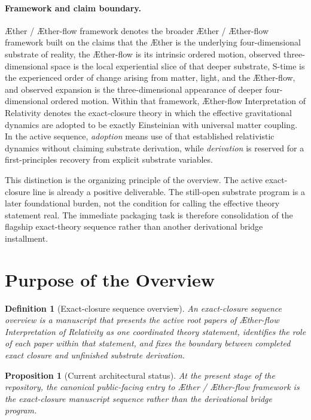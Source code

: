 \documentclass[11pt]{article}
\newcommand{\Aether}{\AE{}ther}
\newcommand{\Aflow}{\AE{}ther-flow}
\newcommand{\TheoryName}{\Aflow{} Interpretation of Relativity}
\newcommand{\TheoryProgram}{\Aether{} / \Aflow{} framework}
\newtheorem{definition}{Definition}
\newtheorem{proposition}{Proposition}
\begin{document}
\paragraph{Framework and claim boundary.}
\TheoryProgram{} denotes the broader \Aether{} / \Aflow{} framework built on the claims that the \Aether{} is the underlying four-dimensional substrate of reality, the \Aflow{} is its intrinsic ordered motion, observed three-dimensional space is the local experiential slice of that deeper substrate, S-time is the experienced order of change arising from matter, light, and the \Aflow{}, and observed expansion is the three-dimensional appearance of deeper four-dimensional ordered motion. Within that framework, \TheoryName{} denotes the exact-closure theory in which the effective gravitational dynamics are adopted to be exactly Einsteinian with universal matter coupling. In the active sequence, \emph{adoption} means use of that established relativistic dynamics without claiming substrate derivation, while \emph{derivation} is reserved for a first-principles recovery from explicit substrate variables.

This distinction is the organizing principle of the overview. The active exact-closure line is already a positive deliverable. The still-open substrate program is a later foundational burden, not the condition for calling the effective theory statement real. The immediate packaging task is therefore consolidation of the flagship exact-theory sequence rather than another derivational bridge installment.

\section{Purpose of the Overview}

\begin{definition}[Exact-closure sequence overview]
An exact-closure sequence overview is a manuscript that presents the active root papers of \TheoryName{} as one coordinated theory statement, identifies the role of each paper within that statement, and fixes the boundary between completed exact closure and unfinished substrate derivation.
\end{definition}

\begin{proposition}[Current architectural status]
At the present stage of the repository, the canonical public-facing entry to \TheoryProgram{} is the exact-closure manuscript sequence rather than the derivational bridge program.
\end{proposition}
\end{document}
